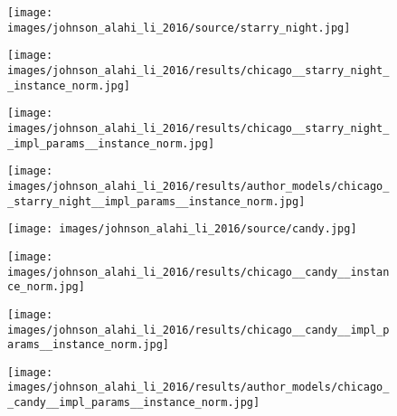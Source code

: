 \begin{figure}[H]
\begin{minipage}[t]{0.24\textwidth}
	\end{minipage}
	\hfill%
	\begin{minipage}[t]{0.24\textwidth}
		\centering
		\texttt{[image: images/johnson\_alahi\_li\_2016/source/starry\_night.jpg]}
	\end{minipage}
	\hfill%
	\begin{minipage}[t]{0.24\textwidth}
		\centering
		\texttt{[image: images/johnson\_alahi\_li\_2016/results/chicago\_\_starry\_night\_\_instance\_norm.jpg]}
	\end{minipage}
	\hfill%
	\begin{minipage}[t]{0.24\textwidth}
		\centering
		\texttt{[image: images/johnson\_alahi\_li\_2016/results/chicago\_\_starry\_night\_\_impl\_params\_\_instance\_norm.jpg]}
	\end{minipage}
	\hfill%
	\begin{minipage}[t]{0.24\textwidth}
		\centering
		\texttt{[image: images/johnson\_alahi\_li\_2016/results/author\_models/chicago\_\_starry\_night\_\_impl\_params\_\_instance\_norm.jpg]}
	\end{minipage}
    \hfill%
	\begin{minipage}[t]{0.24\textwidth}
		\centering
		\texttt{[image: images/johnson\_alahi\_li\_2016/source/candy.jpg]}
	\end{minipage}
	\hfill%
	\begin{minipage}[t]{0.24\textwidth}
		\centering
		\texttt{[image: images/johnson\_alahi\_li\_2016/results/chicago\_\_candy\_\_instance\_norm.jpg]}
	\end{minipage}
	\hfill%
	\begin{minipage}[t]{0.24\textwidth}
		\centering
		\texttt{[image: images/johnson\_alahi\_li\_2016/results/chicago\_\_candy\_\_impl\_params\_\_instance\_norm.jpg]}
	\end{minipage}
	\hfill%
	\begin{minipage}[t]{0.24\textwidth}
		\centering
		\texttt{[image: images/johnson\_alahi\_li\_2016/results/author\_models/chicago\_\_candy\_\_impl\_params\_\_instance\_norm.jpg]}
	\end{minipage}

\end{figure}
